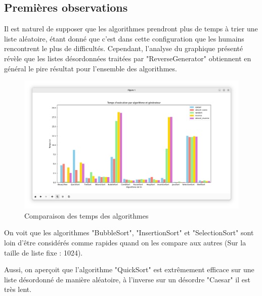 \documentclass[a4paper,12pt]{article}
\begin{document}
\subsection{Premières observations}

Il est naturel de supposer que les algorithmes prendront plus de temps à trier une liste aléatoire, étant donné que c'est dans cette configuration que les humains rencontrent le plus de difficultés. Cependant, l'analyse du graphique présenté révèle que les listes désordonnées traitées par "ReverseGenerator" obtiennent en général le pire résultat pour l'ensemble des algorithmes.

\begin{figure}[h]
    \centering
    \includegraphics[width=\textwidth]{ScreenBetter.png}
    \caption{Comparaison des temps des algorithmes}
    \label{screenBetter}
\end{figure}

On voit que les algorithmes "BubbleSort", "InsertionSort" et "SelectionSort" sont loin d'être considérés comme rapides quand on les compare aux autres (Sur la taille de liste fixe : 1024).

Aussi, on aperçoit que l'algorithme "QuickSort" est extrêmement efficace sur une liste désordonné de manière aléatoire, à l'inverse sur un désordre "Caesar" il est très lent.
\end{document}
